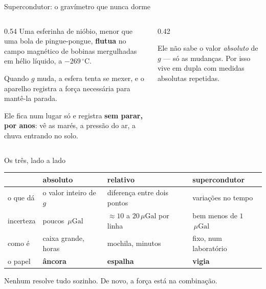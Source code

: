 \documentclass[aspectratio=169,11pt]{beamer}
\newcommand{\bnum}[1]{\textbf{\textcolor{mTeal}{#1}}}
\newcommand{\uGal}{\ensuremath{\,\mu\mathrm{Gal}}\xspace}
\begin{document}
\begin{frame}{Supercondutor: o gravímetro que nunca dorme}
  \begin{columns}[T]
    \begin{column}{0.54\textwidth}
      Uma esferinha de nióbio, menor que uma bola de pingue-pongue, \bnum{flutua} no campo
      magnético de bobinas mergulhadas em hélio líquido, a $-269\,^{\circ}$C.
      \medskip

      Quando $g$ muda, a esfera tenta se mexer, e o aparelho registra a força necessária
      para mantê-la parada.
      \medskip

      Ele fica num lugar só e registra \bnum{sem parar, por anos}: vê as marés, a pressão do
      ar, a chuva entrando no solo.
    \end{column}
    \begin{column}{0.42\textwidth}
      \centering
      \medskip
      \begin{cuidado}
        \small Ele não sabe o valor \emph{absoluto} de $g$ --- só as mudanças. Por isso vive
        em dupla com medidas absolutas repetidas.
      \end{cuidado}
    \end{column}
  \end{columns}
\end{frame}

\begin{frame}{Os três, lado a lado}
  \centering
  \small
  \renewcommand{\arraystretch}{1.45}
  \begin{tabular}{llll}
    \toprule
    & \textbf{absoluto} & \textbf{relativo} & \textbf{supercondutor} \\
    \midrule
    o que dá & o valor inteiro de $g$ & diferença entre dois pontos & variações no tempo \\
    incerteza & poucos \uGal & $\approx 10$ a $20$\uGal por linha & bem menos de $1$\uGal \\
    como é & caixa grande, horas & mochila, minutos & fixo, num laboratório \\
    o papel & \bnum{âncora} & \bnum{espalha} & \bnum{vigia} \\
    \bottomrule
  \end{tabular}
  \bigskip

  Nenhum resolve tudo sozinho. De novo, a força está na \alert{combinação}.
\end{frame}
\end{document}

